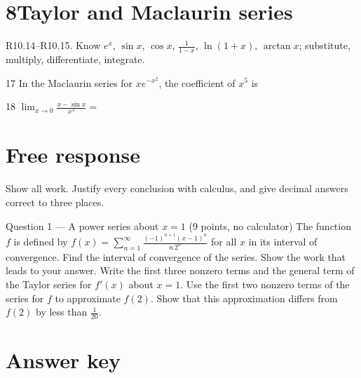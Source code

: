 \documentclass{apcalc}
\begin{document}
\section*{8\quad Taylor and Maclaurin series}
\begin{setrule}R10.14–R10.15. Know $e^x$, $\sin x$, $\cos x$, $\frac{1}{1-x}$, $\ln(1+x)$, $\arctan x$; substitute, multiply, differentiate, integrate.\end{setrule}
\begin{q}{17}
In the Maclaurin series for $xe^{-x^2}$, the coefficient of $x^5$ is
\end{q}
\begin{q}{18}
$\displaystyle\lim_{x\to0}\frac{x-\sin x}{x^3}=$
\end{q}
\clearpage\section*{Free response}
Show all work. Justify every conclusion with calculus, and give decimal answers correct to three places.
\begin{frq}{Question 1 --- A power series about $x=1$ (9 points, no calculator)}
The function $f$ is defined by $f(x)=\displaystyle\sum_{n=1}^{\infty}\frac{(-1)^{n+1}(x-1)^n}{n\,2^n}$ for all $x$ in its interval of convergence.
Find the interval of convergence of the series. Show the work that leads to your answer.\workspace{1.6in}
Write the first three nonzero terms and the general term of the Taylor series for $f'(x)$ about $x=1$.\workspace{1.6in}
Use the first two nonzero terms of the series for $f$ to approximate $f(2)$. Show that this approximation differs from $f(2)$ by less than $\frac{1}{20}$.\workspace{1.6in}
\end{frq}
\clearpage\section*{Answer key}
\vspace{4pt}
\end{document}
